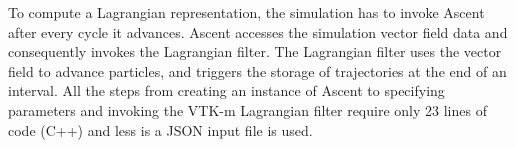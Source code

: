 To compute a Lagrangian representation, the simulation has to invoke Ascent after every cycle it advances.
%
Ascent accesses the simulation vector field data and consequently invokes the Lagrangian filter. 
%
The Lagrangian filter uses the vector field to advance particles, and triggers the storage of trajectories at the end of an interval.
%
%
All the steps from creating an instance of Ascent to specifying parameters and invoking the VTK-m Lagrangian filter require only 23 lines of code (C++) and less is a JSON input file is used.
%
%
%
%
%
%
%
